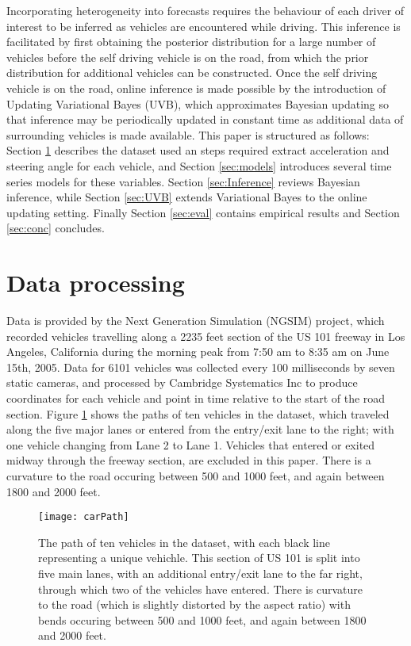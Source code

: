 \documentclass[12pt,a4paper]{article}\usepackage[]{graphicx}\usepackage[]{color}
\begin{document}
Incorporating heterogeneity into forecasts requires the behaviour of each driver of interest to be inferred as vehicles are encountered while driving. This inference is facilitated by first obtaining the posterior distribution for a large number of vehicles before the self driving vehicle is on the road, from which the prior distribution for additional vehicles can be constructed. Once the self driving vehicle is on the road, online inference is made possible by the introduction of Updating Variational Bayes (UVB), which approximates Bayesian updating so that inference may be periodically updated in constant time as additional data of surrounding vehicles is made available. This paper is structured as follows: Section \ref{sec:dataProcessing} describes the dataset used an steps required extract acceleration and steering angle for each vehicle, and Section \ref{sec:models} introduces several time series models for these variables. Section \ref{sec:Inference} reviews Bayesian inference, while Section \ref{sec:UVB} extends Variational Bayes to the online updating setting. Finally Section \ref{sec:eval} contains empirical results and Section \ref{sec:conc} concludes.

\section{Data processing}
\label{sec:dataProcessing}
Data is provided by the Next Generation Simulation (NGSIM) project, which recorded vehicles travelling along a 2235 feet section of the US 101 freeway in Los Angeles, California during the morning peak from 7:50 am to 8:35 am on June 15th, 2005. Data for 6101 vehicles was collected every 100 milliseconds by seven static cameras, and processed by Cambridge Systematics Inc to produce coordinates for each vehicle and point in time relative to the start of the road section. 
Figure \ref{fig:rawData} shows the paths of ten vehicles in the dataset, which traveled along the five major lanes or entered from the entry/exit lane to the right; with one vehicle changing from Lane 2 to Lane 1. Vehicles that entered or exited midway through the freeway section, are excluded in this paper. There is a curvature to the road occuring between 500 and 1000 feet, and again between 1800 and 2000 feet.
\\

\begin{figure}
\centering
\texttt{[image: carPath]}
\caption{The path of ten vehicles in the dataset, with each black line representing a unique vehichle. This section of US 101 is split into five main lanes, with an additional entry/exit lane to the far right, through which two of the vehicles have entered. There is curvature to the road (which is slightly distorted by the aspect ratio) with bends occuring between 500 and 1000 feet, and again between 1800 and 2000 feet.}
\label{fig:rawData}
\end{figure}
\end{document}

